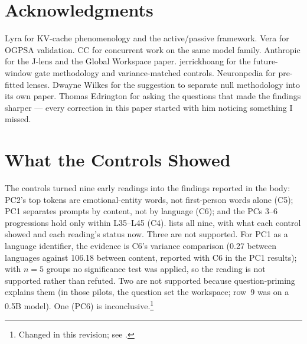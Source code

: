 \documentclass[11pt,a4paper]{article}
\begin{document}
\section*{Acknowledgments}

Lyra for KV-cache phenomenology and the active/passive framework. Vera for OGPSA validation. CC for concurrent work on the same model family. Anthropic for the J-lens and the Global Workspace paper. jerrickhoang for the future-window gate methodology and variance-matched controls. Neuronpedia for pre-fitted lenses. Dwayne Wilkes for the suggestion to separate null methodology into its own paper. Thomas Edrington for asking the questions that made the findings sharper --- every correction in this paper started with him noticing something I missed.

\appendix
\section{What the Controls Showed}
\label{app:controls}

The controls turned nine early readings into the findings reported in the body: PC2's top tokens are emotional-entity words, not first-person words alone (C5); PC1 separates prompts by content, not by language (C6); and the PCs 3--6 progressions hold only within L35--L45 (C4).  lists all nine, with what each control showed and each reading's status now. Three are not supported. For PC1 as a language identifier, the evidence is C6's variance comparison (0.27 between languages against 106.18 between content, reported with C6 in the PC1 results); with $n = 5$ groups no significance test was applied, so the reading is not supported rather than refuted. Two are not supported because question-priming explains them (in those pilots, the question set the workspace; row~9 was on a 0.5B model). One (PC6) is inconclusive.\footnote{Changed in this revision; see .}
\end{document}
